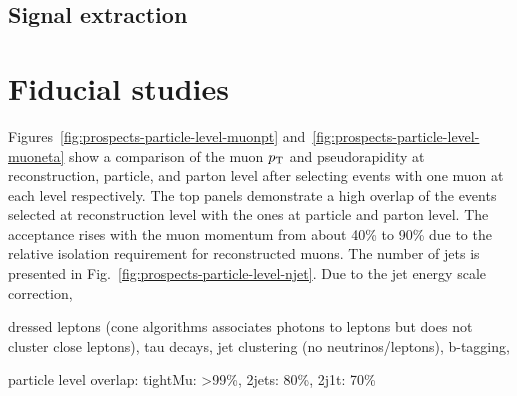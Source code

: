 
\subsection{Signal extraction}
\label{sec:prospects-fit}

\section{Fiducial studies}
\label{sec:prospects-fiducial-studies}



Figures~\ref{fig:prospects-particle-level-muonpt} and~\ref{fig:prospects-particle-level-muoneta} show a comparison of the muon $p_\textrm{T}$ and pseudorapidity at reconstruction, particle, and parton level after selecting events with one muon at each level respectively. The top panels demonstrate a high overlap of the events selected at reconstruction level with the ones at particle and parton level. The acceptance rises with the muon momentum from about 40\% to 90\% due to the relative isolation requirement for reconstructed muons. The number of jets is presented in Fig.~\ref{fig:prospects-particle-level-njet}. Due to the jet energy scale correction, 


dressed leptons (cone algorithms associates photons to leptons but does not cluster close leptons), tau decays, jet clustering (no neutrinos/leptons), b-tagging,




particle level overlap: tightMu: >99\%, 2jets: 80\%, 2j1t: 70\%


